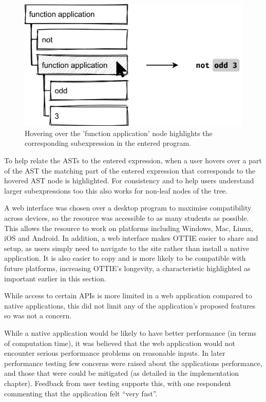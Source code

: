 \documentclass[a4paper,fleqn,oneside,12pt]{report}
\begin{document}
{\centering \begin{figure}[h!]
  \centering
  \includegraphics[width=0.75\linewidth]{images/image26.png}
  \caption{Hovering over the 'function application' node highlights the corresponding subexpression in the entered program.}
\end{figure} \par}

To help relate the ASTs to the entered expression, when a user hovers over a part of the AST the matching part of the entered expression that corresponds to the hovered AST node is highlighted. For consistency and to help users understand larger subexpressions too this also works for non-leaf nodes of the tree.

A web interface was chosen over a desktop program to maximise compatibility across devices, so the resource was accessible to as many students as possible. This allows the resource to work on platforms including Windows, Mac, Linux, iOS and Android. In addition, a web interface makes OTTIE easier to share and setup, as users simply need to navigate to the site rather than install a native application. It is also easier to copy and is more likely to be compatible with future platforms, increasing OTTIE's longevity, a characteristic highlighted as important earlier in this section.

While access to certain APIs is more limited in a web application compared to native applications, this did not limit any of the application's proposed features so was not a concern.

While a native application would be likely to have better performance (in terms of computation time), it was believed that the web application would not encounter serious performance problems on reasonable inputs. In later performance testing few concerns were raised about the applications performance, and those that were could be mitigated (as detailed in the implementation chapter). Feedback from user testing supports this, with one respondent commenting that the application felt ``very fast''.
\end{document}
